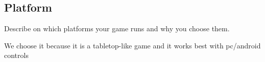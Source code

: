 \subsection{Platform}
Describe on which platforms your game runs and why you choose them.

We choose it because it is a tabletop-like game and it works best with pc/android controls

\clearpage